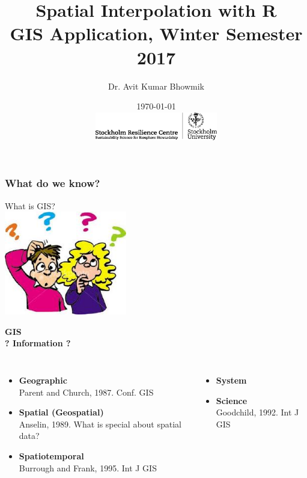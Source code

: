 \documentclass{beamer}
\title[Spatial Interpolation. GIS Application `17]{Spatial Interpolation with R\\
\medskip \tiny{GIS Application, Winter Semester 2017}} %
\author[Avit Bhowmik]{Dr. Avit Kumar Bhowmik \\} %
\institute[SRC] %
{
\textit{avit.bhowmik@su.se}%
}
\date[\today]{\today \\[0.5cm]
\includegraphics[width=0.4\textwidth]{Figures/SRC_logo.png}} %
\begin{document}
\begin{frame}
\titlepage %
\end{frame}


\begin{frame}
\frametitle{What do we know?}
\centering
\Huge \alert{What is GIS?}\\
\vspace{1cm}
\includegraphics[width=0.4\textwidth]{Figures/Questions.png}
\end{frame}


\begin{frame}
\centering
\Huge \alert{\textbf{GIS}}\\
\pause
\Large \textbf{? Information ?}
\pause
\medskip
\normalsize
\begin{columns}[t]
\begin{itemize}
\item \alert{\textbf{Geographic}}\\
Parent and Church, 1987. Conf. GIS
\item \alert {\textbf {Spatial (Geospatial)}}\\
Anselin, 1989. What is special about spatial data?
\item \alert{\textbf{Spatiotemporal}}\\
Burrough and Frank, 1995. Int J GIS
\end{itemize}
\hspace{2cm}
\pause
{}
\begin{itemize}
\item \alert{\textbf{System}}
\item \alert{\textbf{Science}}\\
Goodchild, 1992. Int J GIS
\end{itemize}
\end{columns}
\end{frame}
\end{document}
